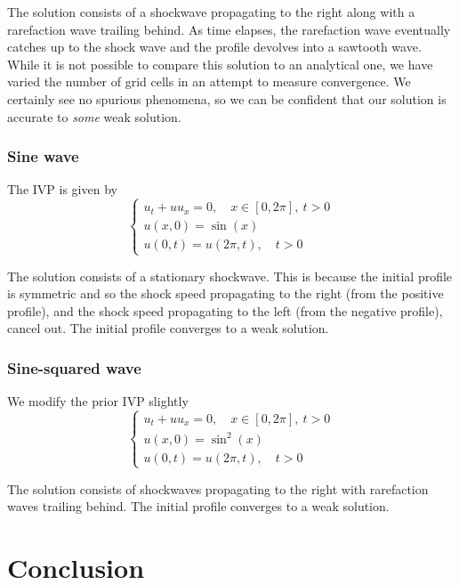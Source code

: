 \documentclass{myproject}
\begin{document}
 The solution consists of a shockwave propagating to the right along with a rarefaction wave trailing behind. As time elapses, the rarefaction wave eventually catches up to the shock wave and the profile devolves into a sawtooth wave. While it is not possible to compare this solution to an analytical one, we have varied the number of grid cells in an attempt to measure convergence. We certainly see no spurious phenomena, so we can be confident that our solution is accurate to \emph{some} weak solution.

\subsubsection{Sine wave}

The IVP is given by
\begin{equation}\label{sine_wave}
    \begin{cases}
        u_t + uu_x = 0, \quad x \in [0, 2\pi], \: t>0 \\
        u(x,0) = \sin(x) \\
        u(0,t) = u(2\pi,t), \quad t > 0
    \end{cases}
\end{equation}

The solution consists of a stationary shockwave. This is because the initial profile is symmetric and so the shock speed propagating to the right (from the positive profile), and the shock speed propagating to the left (from the negative profile), cancel out. The initial profile converges to a weak solution.

\subsubsection{Sine-squared wave}

We modify the prior IVP slightly
\begin{equation}\label{sine-squared_wave}
    \begin{cases}
        u_t + uu_x = 0, \quad x \in [0, 2\pi], \: t>0 \\
        u(x,0) = \sin^2(x) \\
        u(0,t) = u(2\pi,t), \quad t > 0
    \end{cases}
\end{equation}

The solution consists of shockwaves propagating to the right with rarefaction waves trailing behind. The initial profile converges to a weak solution.


\section{Conclusion}
\end{document}
